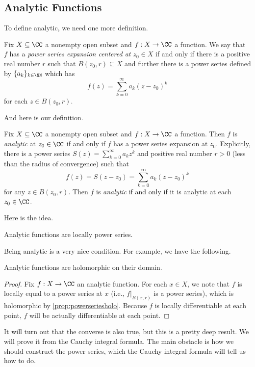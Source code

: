 \subsection{Analytic Functions}
To define analytic, we need one more definition.
\begin{definition}
	Fix $X\subseteq\CC$ a nonempty open subset and $f:X\to\CC$ a function. We say that $f$ has a \textit{power series expansion centered at $z_0\in X$}
	if and only if there is a positive real number $r$ such that $B(z_0,r)\subseteq X$ and further there is a power series defined by
	$\{a_k\}_{k\in\NN}$ which has
	\[f(z)=\sum_{k=0}^\infty a_k(z-z_0)^k\]
	for each $z\in B(z_0,r)$.
\end{definition}
And here is our definition.
\begin{definition}[Analytic]
	Fix $X\subseteq\CC$ a nonempty open subset and $f:X\to\CC$ a function. Then $f$ is \textit{analytic} at $z_0\in\CC$ if and only if $f$ has a power series expansion at $z_0$. Explicitly, there is a power series $S(z)=\sum_{k=0}^\infty a_kz^k$ and positive real number $r>0$ (less than the radius of convergence) such that
	\[f(z)=S(z-z_0)=\sum_{k=0}^\infty a_k(z-z_0)^k\]
	for any $z\in B(z_0,r)$. Then $f$ is \textit{analytic} if and only if it is analytic at each $z_0\in\CC$.
\end{definition}
Here is the idea.
\begin{idea}
	Analytic functions are locally power series.
\end{idea}
Being analytic is a very nice condition. For example, we have the following.
\begin{proposition} \label{prop:anaisholo}
	Analytic functions are holomorphic on their domain.
\end{proposition}
\begin{proof}
	Fix $f:X\to\CC$ an analytic function. For each $x\in X$, we note that $f$ is locally equal to a power series at $x$ (i.e., $f|_{B(x,r)}$ is a power series), which is holomorphic by \autoref{prop:powerseriesholo}. Because $f$ is locally differentiable at each point, $f$ will be actually differentiable at each point.
\end{proof}
\begin{remark}
	It will turn out that the converse is also true, but this is a pretty deep result. We will prove it from the Cauchy integral formula. The main obstacle is how we should construct the power series, which the Cauchy integral formula will tell us how to do.
\end{remark}

